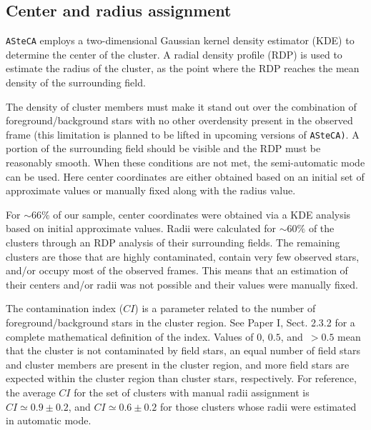 \documentclass[draft]{aa}
\begin{document}

\subsection{Center and radius assignment}
\label{ssec:centre-radius}

\texttt{ASteCA} employs a two-dimensional Gaussian kernel density estimator 
(KDE) to determine the center of the cluster. A radial density profile (RDP) is
used to estimate the radius of the cluster, as the point where the RDP reaches the
mean density of the surrounding field.

The density of cluster members must make it stand out over the combination of
foreground/background stars with no other overdensity present in the observed
frame (this limitation is planned to be lifted in upcoming versions of
\texttt{ASteCA)}. A portion of the surrounding field should be visible and the
RDP must be reasonably smooth.
%
When these conditions are not met, the semi-automatic mode can be used. Here
center coordinates are either obtained based on an initial set of approximate
values or manually fixed along with the radius value.

For ${\sim}66\%$ of our sample, center coordinates were obtained via a KDE
analysis based on initial approximate values. Radii were calculated for
${\sim}60\%$ of the clusters through an RDP analysis of their surrounding
fields.
%
The remaining clusters are those that are highly contaminated, contain very few
observed stars, and/or occupy most of the observed frames. This means that an
estimation of their centers and/or radii was not possible and their values
were manually fixed.

The contamination index ($CI$) is a parameter related to the number of
foreground/background stars in the cluster region. See Paper
I, Sect. 2.3.2 for a complete mathematical definition of the index.
Values of $0,\,0.5$, and $\,{>}0.5$ mean that the cluster is not
contaminated by field stars, an equal number of field stars and cluster
members are present in the cluster region, and more field stars are
expected within the cluster region than cluster stars, respectively.
%
For reference, the average $CI$ for the set of clusters with manual radii
assignment is $CI{\simeq}0.9{\pm}0.2$, and $CI{\simeq}0.6\pm0.2$ for those
clusters whose radii were estimated in automatic mode.
\end{document}
